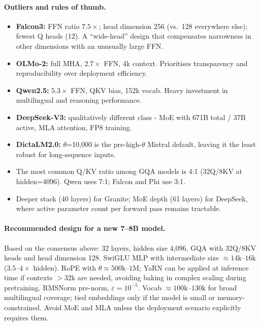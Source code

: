 \documentclass[11pt, a4paper]{article}
\begin{document}
\paragraph{Outliers and rules of thumb.}
\begin{itemize}[noitemsep]
  \item \textbf{Falcon3:} FFN ratio $7.5\times$; head dimension 256 (vs.\ 128
        everywhere else); fewest Q heads (12). A ``wide-head'' design that
        compensates narrowness in other dimensions with an unusually large FFN.
  \item \textbf{OLMo-2:} full MHA, $2.7\times$ FFN, 4k context. Prioritises
        transparency and reproducibility over deployment efficiency.
  \item \textbf{Qwen2.5:} $5.3\times$ FFN, QKV bias, 152k vocab. Heavy
        investment in multilingual and reasoning performance.
  \item \textbf{DeepSeek-V3:} qualitatively different class - MoE with 671B
        total / 37B active, MLA attention, FP8 training.
  \item \textbf{DictaLM2.0:} $\theta$=10,000 is the pre-high-$\theta$ Mistral
        default, leaving it the least robust for long-sequence inputs.
  \item The most common Q/KV ratio among GQA models is 4:1 (32Q/8KV at
        hidden=4096). Qwen uses 7:1; Falcon and Phi use 3:1.
  \item Deeper stack (40 layers) for Granite; MoE depth (61 layers) for
        DeepSeek, where active parameter count per forward pass remains
        tractable.
\end{itemize}

\paragraph{Recommended design for a new 7--8B model.}
Based on the consensus above: 32 layers, hidden size 4,096, GQA with 32Q/8KV
heads and head dimension 128.
SwiGLU MLP with intermediate size $\approx14\text{k}$--$16\text{k}$
($3.5$--$4\times$ hidden).
RoPE with $\theta\approx500\text{k}$--$1\text{M}$; YaRN can be applied at
inference time if contexts $>32\text{k}$ are needed, avoiding baking in complex
scaling during pretraining.
RMSNorm pre-norm, $\varepsilon=10^{-5}$.
Vocab $\approx100\text{k}$--$130\text{k}$ for broad multilingual coverage;
tied embeddings only if the model is small or memory-constrained.
Avoid MoE and MLA unless the deployment scenario explicitly requires them.
\end{document}
